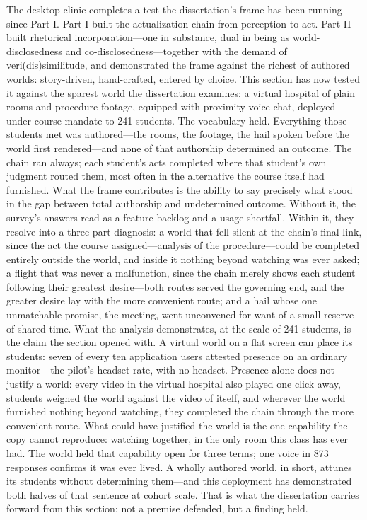 
The desktop clinic completes a test the dissertation's frame has been
running since Part I. Part I built the actualization chain from
perception to act. Part II built rhetorical incorporation---one in
substance, dual in being as world-disclosedness and
co-disclosedness---together with the demand of veri(dis)similitude, and
demonstrated the frame against the richest of authored worlds:
story-driven, hand-crafted, entered by choice. This section has now
tested it against the sparest world the dissertation examines: a
virtual hospital of plain rooms and procedure footage, equipped with
proximity voice chat, deployed under course mandate to 241 students.
The vocabulary held. Everything those
students met was authored---the rooms, the footage, the hail spoken
before the world first rendered---and none of that authorship
determined an outcome. The chain ran always; each student's acts
completed where that student's own judgment routed them, most often in
the alternative the course itself had furnished. What the frame
contributes is the ability to say precisely what stood in the gap
between total authorship and undetermined outcome. Without it, the
survey's answers read as a feature backlog and a usage shortfall.
Within it, they resolve into a three-part diagnosis: a world that fell
silent at the chain's final link, since the act the course
assigned---analysis of the procedure---could be completed entirely
outside the world, and inside it nothing beyond watching was ever
asked; a flight that was never a malfunction, since the chain merely
shows each student following their greatest desire---both routes
served the governing end, and the greater desire lay with the more
convenient route; and a hail whose one unmatchable promise, the
meeting, went unconvened for want of a small reserve of shared time. What
the analysis demonstrates, at the scale of 241 students, is the claim
the section opened with. A virtual world on a flat screen can place its
students: seven of every ten application users attested presence on an
ordinary monitor---the pilot's headset rate, with no headset. Presence
alone does not justify a world: every video in the virtual hospital
also played one click away, students weighed the world against the
video of itself, and wherever the world furnished nothing beyond
watching, they completed the chain through the more convenient route.
What could have justified the world is the one capability the copy
cannot reproduce: watching together, in the only room this class has
ever had. The world held that capability open for three terms; one
voice in 873 responses confirms it was ever lived. A wholly authored
world, in short, attunes its students without determining them---and
this deployment has demonstrated both halves of that sentence at
cohort scale. That is what the dissertation carries forward from this
section: not a premise defended, but a finding held.
